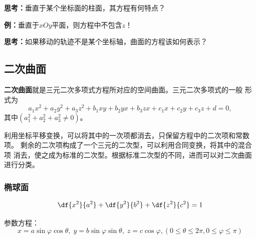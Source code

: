 \begin{center}
\end{center}

{\bf 思考：}垂直于某个坐标面的柱面，其方程有何特点？

{\bf 例：}垂直于$xOy$平面，则方程中不包含$z$！

{\bf 思考：}如果移动的轨迹不是某个坐标轴，曲面的方程该如何表示？

\subsection{二次曲面}

{\bf 二次曲面}就是{\kaishu 三元二次多项式方程}所对应的空间曲面。三元二次多项式的一般
形式为
$$a_1x^2+a_2y^2+a_3z^2+b_1xy+b_2yx+b_3zx +c_1x+c_2y+c_3z+d =  0,
$$
其中$(a_1^2+a_2^2+a_3^2\ne 0)$。

利用坐标平移变换，可以将其中的一次项都消去，只保留方程中的二次项和常数项。
剩余的二次项构成了一个三元的二次型，可以利用合同变换，将其中的混合项
消去，使之成为标准的二次型。根据标准二次型的不同，进而可以对二次曲面进行分类。

\subsubsection{椭球面}
$${\df{x^2}{a^2}+\df{y^2}{b^2}+\df{z^2}{c^2}=1}$$
\begin{center}
\end{center}
参数方程：
$${x=a\sin\varphi\cos\theta,\;y=b\sin\varphi\sin\theta,\;z=c\cos\varphi},
{(0\leq\theta\leq
2\pi,0\leq\varphi\leq\pi)}$$

